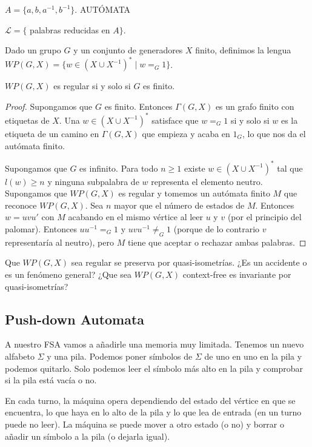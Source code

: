 \documentclass[twoside, 11pt]{article}
\begin{document}
\begin{ej}
$A=\{a,b,a^{-1},b^{-1}\}$. AUTÓMATA

$\mathcal{L}=\{$ palabras reducidas en $A\}$.
\end{ej}

Dado un grupo $G$ y un conjunto de generadores $X$ finito, definimos la lengua $WP(G,X)=\{w\in (X\cup X^{-1})^*\mid w=_G 1\}$.

\begin{lemma}[Anisimov]
$WP(G,X)$ es regular si y solo si $G$ es finito.
\end{lemma}
\begin{proof}
Supongamos que $G$ es finito. Entonces $\Gamma(G,X)$ es un grafo finito con etiquetas de $X$. Una $w\in (X\cup X^{-1})^*$ satisface que $w=_G1$ si y solo si $w$ es la etiqueta de un camino en $\Gamma(G,X)$ que empieza y acaba en $1_G$, lo que nos da el autómata finito.

Supongamos que $G$ es infinito. Para todo $n\geq 1$ existe $w\in (X\cup X^{-1})^*$ tal que $l(w)\geq n$ y ninguna subpalabra de $w$ representa el elemento neutro. Supongamos que $WP(G,X)$ es regular y tomemos un autómata finito $M$ que reconoce $WP(G,X)$. Sea $n$ mayor que el número de estados de $M$. Entonces $w=uvu'$ con $M$ acabando en el mismo vértice al leer $u$ y $v$ (por el principio del palomar). Entonces $uu^{-1}=_G 1$ y $uvu^{-1}\neq_G 1$ (porque de lo contrario $v$ representaría al neutro), pero $M$ tiene que aceptar o rechazar ambas palabras. 
\end{proof}

\begin{observacion}
Que $WP(G,X)$ sea regular se preserva por quasi-isometrías. ¿Es un accidente o es un fenómeno general? ¿Que sea $WP(G,X)$ context-free es invariante por quasi-isometrías?
\end{observacion}

\subsection{Push-down Automata}

A nuestro FSA vamos a añadirle una memoria muy limitada. Tenemos un nuevo alfabeto $\Sigma$ y una pila. Podemos poner símbolos de $\Sigma$ de uno en uno en la pila y podemos quitarlo. Solo podemos leer el símbolo más alto en la pila y comprobar si la pila está vacía o no.

En cada turno, la máquina opera dependiendo del estado del vértice en que se encuentra, lo que haya en lo alto de la pila y lo que lea de entrada (en un turno puede no leer). La máquina se puede mover a otro estado (o no) y borrar o añadir un símbolo a la pila (o dejarla igual).
\end{document}
